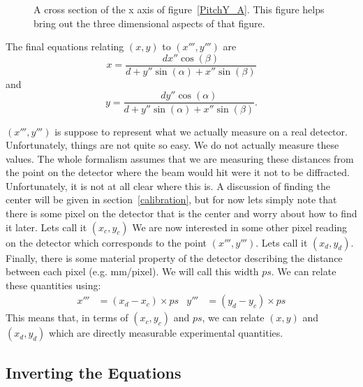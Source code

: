 \begin{SCfigure}
\centering
 
\label{PitchY_B}
\end{SCfigure}

\begin{SCfigure}
\centering
 
\label{PitchY_C}
\caption{A cross section of the x axis of 
figure~\ref{PitchY_A}. This figure helps bring out
the three dimensional aspects of that figure. }
\end{SCfigure}

The final equations relating $(x,y)$ to $(x''',y''')$ are 
\begin{equation}\label{xTermsXdoublePrime}
    x=\frac{d x'' \cos(\beta)}{d+y'' 
    \sin(\alpha) + x'' \sin(\beta)} 
\end{equation}
and
\begin{equation}
    y=\frac{d y'' \cos(\alpha)}{d+y'' 
    \sin(\alpha) + x'' \sin(\beta)}.
\end{equation}

$(x''',y''')$ is suppose to represent what we actually
measure on a real detector. Unfortunately, things are
not quite so easy. We do not actually measure these
values. The whole formalism assumes that we are 
measuring these distances from the point on the
detector where the beam would hit were it not to be
diffracted. Unfortunately, it is not at all clear
where this is. A discussion of finding the center will
be given in section~\ref{calibration}, but for now
lets simply note that there is some pixel on the detector
that is the center and worry about how to find it later. 
Lets call it $(x_c,y_c)$ 
We are now interested in some other pixel reading
on the detector which corresponds to the point
$(x''',y''')$. Lets call it $(x_d,y_d)$. Finally,
there is some material property of the detector 
describing the distance between each pixel
(e.g. \unit[1000]{mm/pixel}). We will call
this width $ps$. We can relate these quantities 
using:
\begin{align}\label{conversionToPixels}
    x'''&=(x_d-x_c) \times ps &
    y'''&=(y_d-y_c) \times ps
\end{align}
This means that, in terms of $(x_c,y_c)$ and $ps$,
we can relate $(x,y)$ and $(x_d,y_d)$ which are
directly measurable experimental quantities.


\subsection{Inverting the Equations}

